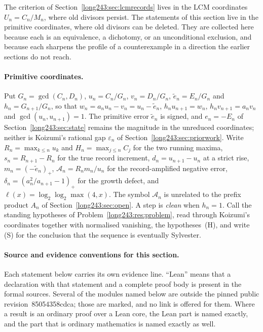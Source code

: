 \documentclass[11pt]{article}
\renewcommand{\commitshort}{85054358cdca}
\begin{document}
The criterion of Section~\ref{long243:sec:lcmrecords} lives in the LCM coordinates
$U_n=C_n/M_n$, where old divisors persist.  The statements of this section live
in the primitive coordinates, where old divisors can be deleted.  They are
collected here because each is
an equivalence, a dichotomy, or an unconditional exclusion, and because each
sharpens the profile of a counterexample in a direction the earlier sections do
not reach.

\paragraph{Primitive coordinates.}
Put $G_n=\gcd(C_n,D_n)$, $u_n=C_n/G_n$, $v_n=D_n/G_n$, $\tilde e_n=E_n/G_n$
and $h_n=G_{n+1}/G_n$, so that $w_n=a_nu_n-v_n=u_n-\tilde e_n$,
$h_nu_{n+1}=w_n$, $h_nv_{n+1}=a_nv_n$ and $\gcd(u_n,u_{n+1})=1$.  The primitive
error $\tilde e_n$ is signed, and $e_n=-E_n$ of Section~\ref{long243:sec:state} remains
the magnitude in the unreduced coordinates; neither is Koizumi's rational gap
$\varepsilon_n$ of Section~\ref{long243:sec:priorwork}.  Write $R_n=\max_{k\le n}u_k$ and
$H_n=\max_{j\le n}C_j$ for the two running maxima, $s_n=R_{n+1}-R_n$ for the
true record increment, $d_n=u_{n+1}-u_n$ at a strict rise,
$m_n=(-\tilde e_n)_+$, $\mathcal A_n=R_nm_n/u_n$ for the record-amplified
negative error, $\delta_n=(a_n^2/a_{n+1}-1)_+$ for the growth defect, and
$\ell(x)=\log_2\log_2\max(4,x)$.  The symbol $\mathcal A_n$ is unrelated to the
prefix product $A_n$ of Section~\ref{long243:sec:open}.  A step is \emph{clean} when $h_n=1$.  Call the
standing hypotheses of Problem~\ref{long243:res:problem}, read through Koizumi's
coordinates together with normalised vanishing, the hypotheses~(H), and write
(S) for the conclusion that the sequence is eventually Sylvester.

\paragraph{Source and evidence conventions for this section.}
Each statement below carries its own evidence line.  ``Lean'' means that a
declaration with that statement and a complete proof body is present in the
formal sources.  Several of the modules named below are outside the pinned
public revision~\commitshort; those are marked, and no link is offered for them.
Where a result is an ordinary proof over a Lean core, the Lean part is named
exactly, and the part that is ordinary mathematics is named exactly as well.
\end{document}
